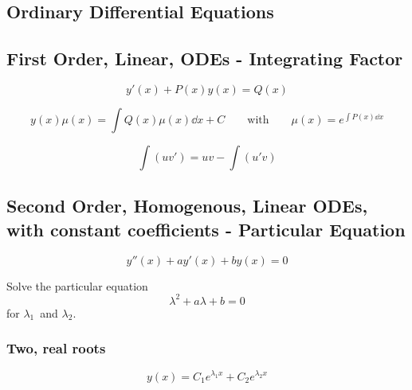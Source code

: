 \documentclass[10pt,a4paper]{article}
\renewcommand{\exp}{e^}
\begin{document}
\begin{multicols}{2}



\section*{Ordinary Differential Equations}




\subsection*{First Order, Linear, ODEs - Integrating Factor}
\[
    y'(x) + P(x) y(x) = Q(x)
\]

\[
    y(x)\mu(x) = \int Q(x)\mu(x) \dd{x} + C \quad\quad\text{with}\quad\quad \mu(x) = \exp{\int P(x)\dd{x}}
\]


\[
    \int (uv') = uv - \int(u'v)
\]



\subsection*{Second Order, Homogenous, Linear ODEs, with constant coefficients - Particular Equation}
\[
    y''(x) + ay'(x) + by(x) = 0
\]

Solve the particular equation
\[
    \lambda^2 + a\lambda + b = 0
\]
for $\lambda_1$ and $\lambda_2$.


\subsubsection*{Two, real roots}
\[
    y(x) = C_1\exp{\lambda_1 x} + C_2\exp{\lambda_2 x}
\]



\end{multicols}
\end{document}
